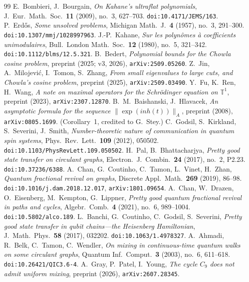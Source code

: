 \documentclass[11pt,reqno]{amsart}
\theoremstyle{plain}
\theoremstyle{definition}
\begin{document}
\begin{thebibliography}{99}
 E.~Bombieri, J.~Bourgain, \emph{On Kahane's ultraflat polynomials}, J.\ Eur.\ Math.\ Soc.\ \textbf{11} (2009), no.~3, 627--703. \texttt{doi:10.4171/JEMS/163}.
 P.~Erd\H{o}s, \emph{Some unsolved problems}, Michigan Math.\ J.\ \textbf{4} (1957), no.~3, 291--300. \texttt{doi:10.1307/mmj/1028997963}.
 J.-P.~Kahane, \emph{Sur les polyn\^omes \`a coefficients unimodulaires}, Bull.\ London Math.\ Soc.\ \textbf{12} (1980), no.~5, 321--342. \texttt{doi:10.1112/blms/12.5.321}.
 B.~Bedert, \emph{Polynomial bounds for the Chowla cosine problem}, preprint (2025; v3, 2026), \texttt{arXiv:2509.05260}.
 Z.~Jin, A.~Milojevi\'c, I.~Tomon, S.~Zhang, \emph{From small eigenvalues to large cuts, and Chowla's cosine problem}, preprint (2025), \texttt{arXiv:2509.03490}.
 Y.~Fu, K.~Ren, H.~Wang, \emph{A note on maximal operators for the Schr\"odinger equation on $\mathbb T^1$}, preprint (2023), \texttt{arXiv:2307.12870}.
 B.~M.~Baishanski, J.~Hlavacek, \emph{An asymptotic formula for the sequence $\|\exp(inh(t))\|_A$}, preprint (2008), \texttt{arXiv:0805.1699}. (Corollary~1, credited to G.~Stey.)
 C.~Godsil, S.~Kirkland, S.~Severini, J.~Smith, \emph{Number-theoretic nature of communication in quantum spin systems}, Phys.\ Rev.\ Lett.\ \textbf{109} (2012), 050502. \texttt{doi:10.1103/PhysRevLett.109.050502}.
 H.~Pal, B.~Bhattacharjya, \emph{Pretty good state transfer on circulant graphs}, Electron.\ J.\ Combin.\ \textbf{24} (2017), no.~2, P2.23. \texttt{doi:10.37236/6388}.
 A.~Chan, G.~Coutinho, C.~Tamon, L.~Vinet, H.~Zhan, \emph{Quantum fractional revival on graphs}, Discrete Appl.\ Math.\ \textbf{269} (2019), 86--98. \texttt{doi:10.1016/j.dam.2018.12.017}, \texttt{arXiv:1801.09654}.
 A.~Chan, W.~Drazen, O.~Eisenberg, M.~Kempton, G.~Lippner, \emph{Pretty good quantum fractional revival in paths and cycles}, Algebr.\ Comb.\ \textbf{4} (2021), no.~6, 989--1004. \texttt{doi:10.5802/alco.189}.
 L.~Banchi, G.~Coutinho, C.~Godsil, S.~Severini, \emph{Pretty good state transfer in qubit chains---the Heisenberg Hamiltonian}, J.\ Math.\ Phys.\ \textbf{58} (2017), 032202. \texttt{doi:10.1063/1.4978327}.
 A.~Ahmadi, R.~Belk, C.~Tamon, C.~Wendler, \emph{On mixing in continuous-time quantum walks on some circulant graphs}, Quantum Inf.\ Comput.\ \textbf{3} (2003), no.~6, 611--618. \texttt{doi:10.26421/QIC3.6-4}.
 A.~Gray, P.~Patel, I.~Young, \emph{The cycle $C_9$ does not admit uniform mixing}, preprint (2026), \texttt{arXiv:2607.28345}.

\end{thebibliography}
\end{document}
